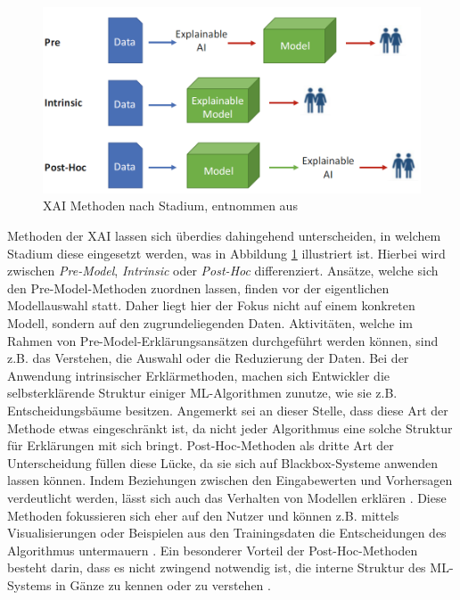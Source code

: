 \begin{figure}
    \centering
    \includegraphics[scale=0.6]{pic/MA-Bilder/explainableAIStages.PNG}
    \caption{XAI Methoden nach Stadium, entnommen aus \cite{kamath2021explainable}}
    \label{Fig:AIMethoden_nach_Stage}
\end{figure}%
Methoden der XAI lassen sich überdies dahingehend unterscheiden, in welchem Stadium diese eingesetzt werden, was in Abbildung \ref{Fig:AIMethoden_nach_Stage} illustriert ist. Hierbei wird zwischen \emph{Pre-Model}, \emph{Intrinsic} oder \emph{Post-Hoc} differenziert. Ansätze, welche sich den Pre-Model-Methoden zuordnen lassen, finden vor der eigentlichen Modellauswahl statt. Daher liegt hier der Fokus nicht auf einem konkreten Modell, sondern auf den zugrundeliegenden Daten. Aktivitäten, welche im Rahmen von Pre-Model-Erklärungsansätzen durchgeführt werden können, sind z.B. das Verstehen, die Auswahl oder die Reduzierung der Daten. Bei der Anwendung intrinsischer Erklärmethoden, machen sich Entwickler die selbsterklärende Struktur einiger ML-Algorithmen zunutze, wie sie z.B. Entscheidungsbäume besitzen. Angemerkt sei an dieser Stelle, dass diese Art der Methode etwas eingeschränkt ist, da nicht jeder Algorithmus eine solche Struktur für Erklärungen mit sich bringt. Post-Hoc-Methoden als dritte Art der Unterscheidung füllen diese Lücke, da sie sich auf Blackbox-Systeme anwenden lassen können. Indem Beziehungen zwischen den Eingabewerten und Vorhersagen verdeutlicht werden, lässt sich auch das Verhalten von Modellen erklären \cite{kamath2021explainable}. Diese Methoden fokussieren sich eher auf den Nutzer und können z.B. mittels Visualisierungen oder Beispielen aus den Trainingsdaten die Entscheidungen des Algorithmus untermauern \cite{xu2019explainable}. Ein besonderer Vorteil der Post-Hoc-Methoden besteht darin, dass es nicht zwingend notwendig ist, die interne Struktur des ML-Systems in Gänze zu kennen oder zu verstehen \cite{kamath2021explainable}. 

